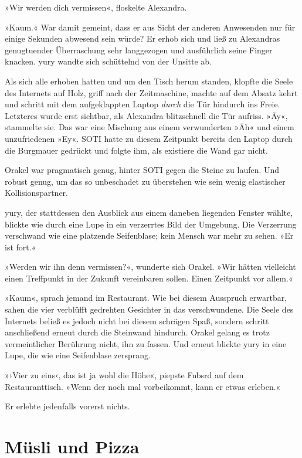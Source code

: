 »Wir werden dich vermissen«, floskelte Alexandra.

»Kaum.« War damit gemeint, dass er aus Sicht der anderen Anwesenden nur für einige Sekunden abwesend sein würde? Er erhob sich und ließ zu Alexandras genugtuender Überraschung sehr langgezogen und ausführlich seine Finger knacken. yury wandte sich schüttelnd von der Unsitte ab.

Als sich alle erhoben hatten und um den Tisch herum standen, klopfte die Seele des Internets auf Holz, griff nach der Zeitmaschine, machte auf dem Absatz kehrt und schritt mit dem aufgeklappten Laptop \emph{durch} die Tür hindurch ins Freie. Letzteres wurde erst sichtbar, als Alexandra blitzschnell die Tür aufriss. »Äy«, stammelte sie. Das war eine Mischung aus einem verwunderten »Äh« und einem unzufriedenen »Ey«. SOTI hatte zu diesem Zeitpunkt bereits den Laptop durch die Burgmauer gedrückt und folgte ihm, als existiere die Wand gar nicht.

Orakel war pragmatisch genug, hinter SOTI gegen die Steine zu laufen. Und robust genug, um das so unbeschadet zu überstehen wie sein wenig elastischer Kollisionspartner.

yury, der stattdessen den Ausblick aus einem daneben liegenden Fenster wählte, blickte wie durch eine Lupe in ein verzerrtes Bild der Umgebung. Die Verzerrung verschwand wie eine platzende Seifenblase; kein Mensch war mehr zu sehen. »Er ist fort.«

»Werden wir ihn denn vermissen?«, wunderte sich Orakel. »Wir hätten vielleicht einen Treffpunkt in der Zukunft vereinbaren sollen. Einen Zeitpunkt vor allem.«

»Kaum«, sprach jemand im Restaurant. Wie bei diesem Ausspruch erwartbar, sahen die vier verblüfft gedrehten Gesichter in das verschwundene. Die Seele des Internets beließ es jedoch nicht bei diesem schrägen Spaß, sondern schritt anschließend erneut durch die Steinwand hindurch. Orakel gelang es trotz vermeintlicher Berührung nicht, ihn zu fassen. Und erneut blickte yury in eine Lupe, die wie eine Seifenblase zersprang.

»›Vier zu eins‹, das ist ja wohl die Höhe«, piepste Fnbsrd auf dem Restauranttisch. »Wenn der noch mal vorbeikommt, kann er etwas erleben.«

Er erlebte jedenfalls vorerst nichts.


\chapter{Müsli und Pizza}

